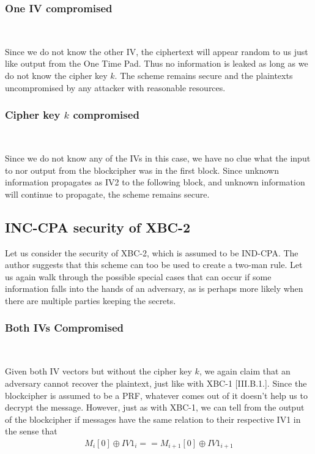 \documentclass[conference]{IEEEtran}
\begin{document}
\subsubsection{One IV compromised} \

Since we do not know the other IV, the ciphertext will appear random to us just like output from the One Time Pad. Thus no information is leaked as long as we do not know the cipher key $k$. The scheme remains secure and the plaintexts uncompromised by any attacker with reasonable resources.

\subsubsection{Cipher key $k$ compromised} \

Since we do not know any of the IVs in this case, we have no clue what the input to nor output from the blockcipher was in the first block. Since unknown information propagates as IV2 to the following block, and unknown information will continue to propagate, the scheme remains secure.

\subsection{INC-CPA security of XBC-2}

Let us consider the security of XBC-2, which is assumed to be IND-CPA. The author suggests that this scheme can too be used to create a two-man rule. Let us again walk through the possible special cases that can occur if some information falls into the hands of an adversary, as is perhaps more likely when there are multiple parties keeping the secrets.

\subsubsection{Both IVs Compromised} \

Given both IV vectors but without the cipher key $k$, we again claim that an adversary cannot recover the plaintext, just like with XBC-1 [III.B.1.]. Since the blockcipher is assumed to be a PRF, whatever comes out of it doesn't help us to decrypt the message. However, just as with XBC-1, we can tell from the output of the blockcipher if messages have the same relation to their respective IV1 in the sense that
\begin{gather*}
  M_i[0] \oplus IV1_i == M_{i+1}[0] \oplus IV1_{i+1}
\end{gather*}
\end{document}
